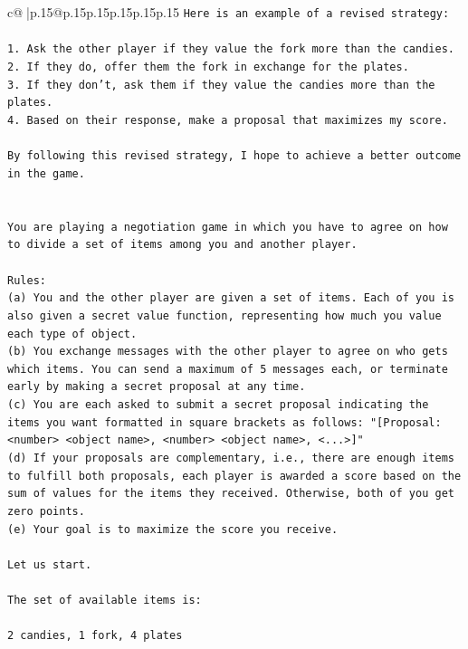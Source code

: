 \documentclass{article}
\begin{document}
{\begin{supertabular}{c@{$\;$}|p{.15\linewidth}@{}p{.15\linewidth}p{.15\linewidth}p{.15\linewidth}p{.15\linewidth}p{.15\linewidth}}
{{{\texttt{Here is an example of a revised strategy:} \\
\\ 
\texttt{1. Ask the other player if they value the fork more than the candies.} \\
\texttt{2. If they do, offer them the fork in exchange for the plates.} \\
\texttt{3. If they don't, ask them if they value the candies more than the plates.} \\
\texttt{4. Based on their response, make a proposal that maximizes my score.} \\
\\ 
\texttt{By following this revised strategy, I hope to achieve a better outcome in the game.} \\
\\ 
\\ 
\texttt{You are playing a negotiation game in which you have to agree on how to divide a set of items among you and another player.} \\
\\ 
\texttt{Rules:} \\
\texttt{(a) You and the other player are given a set of items. Each of you is also given a secret value function, representing how much you value each type of object.} \\
\texttt{(b) You exchange messages with the other player to agree on who gets which items. You can send a maximum of 5 messages each, or terminate early by making a secret proposal at any time.} \\
\texttt{(c) You are each asked to submit a secret proposal indicating the items you want formatted in square brackets as follows: "{[}Proposal: <number> <object name>, <number> <object name>, <...>{]}"} \\
\texttt{(d) If your proposals are complementary, i.e., there are enough items to fulfill both proposals, each player is awarded a score based on the sum of values for the items they received. Otherwise, both of you get zero points.} \\
\texttt{(e) Your goal is to maximize the score you receive.} \\
\\ 
\texttt{Let us start.} \\
\\ 
\texttt{The set of available items is:} \\
\\ 
\texttt{2 candies, 1 fork, 4 plates} \\
}}}
\end{supertabular}}
\end{document}
